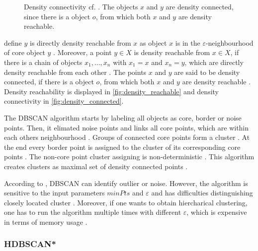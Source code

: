 \begin{figure}[htp] %
    \centering
    
    \caption{Density connectivity cf. \cite{OPTICS1999}.
    The objects $x$ and $y$ are density connected, since there is a object $o$, from which both $x$ and $y$ are density reachable.
    }
    \label{fig:density_connected}
\end{figure}



\citeauthor{OPTICS_kMeans_2016} define $y$ is directly density reachable from $x$ as object $x$ is in the $\varepsilon$-neighbourhood of core object $y$ \cite{OPTICS_kMeans_2016}.
Moreover, a point $y \in X$ is density reachable from $x \in X$, if there is a chain of objects $x_1, ..., x_n$ with $x_1 = x$ and $x_n = y$, 
which are directly density reachable from each other \cite{OPTICS_kMeans_2016}.
The points $x$ and $y$ are said to be density connected, if there is a object $o$, from which both $x$ and $y$ are density reachable \cite{OPTICS_kMeans_2016}.
Density reachability is displayed in \autoref{fig:density_reachable} and density connectivity in \autoref{fig:density_connected}.

The DBSCAN algorithm starts by labeling all objects as core, border or noise points.
Then, it elimated noise points and links all core points, which are within each others neighbourhood \cite{OPTICS_kMeans_2016}.
Groups of connected core points form a cluster \cite{OPTICS_kMeans_2016}.
At the end every border point is assigned to the cluster of its corresponding core points \cite{OPTICS_kMeans_2016}.
The non-core point cluster assigning is non-deterministic \cite{OPTICS2013}.
This algorithm creates clusters as maximal set of density connected points \cite{OPTICS_kMeans_2016}.

According to \citeauthor{OPTICS_kMeans_2016}, DBSCAN can identify outlier or noise.
However, the algorithm is sensitive to the input parameters $minPts$ and $\varepsilon$ and has difficulties distinguishing closely located cluster \cite{OPTICS_kMeans_2016}.
Moreover, if one wants to obtain hiercharical clustering, one has to run the algorithm multiple times with different $\varepsilon$, which is expensive in terms of memory usage \cite{OPTICS2013}.



\subsubsection{HDBSCAN*}\label{subsec:hdbcan}


